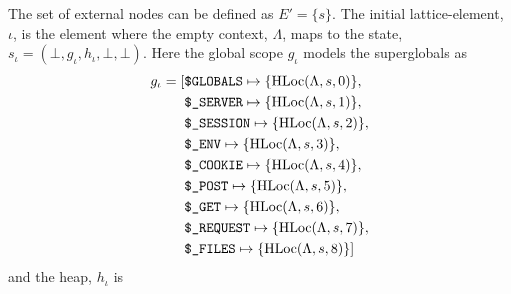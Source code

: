 The set of external nodes can be defined as $E' = \{s\}$. The initial lattice-element, $\iota$, is the element where the empty context, $\Lambda$, maps to the state, $s_\iota = (\bot, g_\iota, h_\iota, \bot, \bot)$. Here the global scope $g_\iota$ models the superglobals as
\begin{align*}
g_\iota = 	[&\texttt{\$GLOBALS}\mapsto \{\text{HLoc}(\Lambda, s, 0)\},\notag\\
			 &\texttt{\$\_SERVER}\mapsto \{\text{HLoc}(\Lambda, s, 1)\},\notag\\
			 &\texttt{\$\_SESSION}\mapsto \{\text{HLoc}(\Lambda, s, 2)\},\notag\\
			 &\texttt{\$\_ENV}\mapsto \{\text{HLoc}(\Lambda, s, 3)\},\notag\\
			 &\texttt{\$\_COOKIE}\mapsto \{\text{HLoc}(\Lambda, s, 4)\},\notag\\
			 &\texttt{\$\_POST}\mapsto \{\text{HLoc}(\Lambda, s, 5)\},\notag\\
			 &\texttt{\$\_GET}\mapsto \{\text{HLoc}(\Lambda, s, 6)\},\notag\\
			 &\texttt{\$\_REQUEST}\mapsto \{\text{HLoc}(\Lambda, s, 7)\}, \notag\\
			 &\texttt{\$\_FILES}\mapsto \{\text{HLoc}(\Lambda, s, 8)\}]
\end{align*} 
and the heap, $h_\iota$ is
